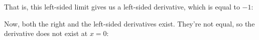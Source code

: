 \documentclass[pdftex, brazil, 12pt, twoside]{article}
\begin{document}
\begin{figure}[H]
  \begin{center}
  \end{center}
\end{figure}

That is, this left-sided limit gives us
a left-sided derivative, which is equal to $-1$:

\begin{figure}[H]
  \begin{center}
  \end{center}
\end{figure}

Now, both the right and the left-sided derivatives exist.
They're not equal, so the derivative
does not exist at $x = 0$:

\begin{figure}[H]
  \begin{center}
  \end{center}
\end{figure}
\end{document}
